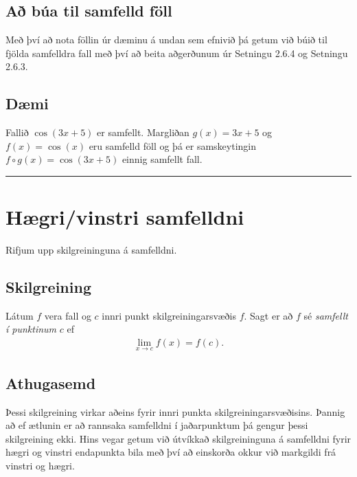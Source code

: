 \documentclass[a4paper,10pt,icelandic]{sphinxmanual}
\begin{document}
\subsection{Að búa til samfelld föll}
\label{kafli02:a-bua-til-samfelld-foll}
Með því að nota föllin úr dæminu á undan sem efnivið þá getum við búið
til fjölda samfelldra fall með því að beita aðgerðunum úr Setningu 2.6.4
og Setningu 2.6.3.


\subsection{Dæmi}
\label{kafli02:id14}\label{kafli02:index-10}
Fallið \(\cos(3x+5)\) er samfellt. Margliðan \(g(x) =3x+5\) og
\(f(x) = \cos(x)\) eru samfelld föll og þá er samskeytingin
\(f\circ g(x) = \cos(3x+5)\) einnig samfellt fall.


\bigskip\hrule{}\bigskip



\section{Hægri/vinstri samfelldni}
\label{kafli02:haegri-vinstri-samfelldni}
Rifjum upp skilgreininguna á samfelldni.


\subsection{Skilgreining}
\label{kafli02:skilgreining}
Látum \(f\) vera fall og \(c\) innri punkt skilgreiningarsvæðis
\(f\). Sagt er að \(f\) sé \emph{samfellt í punktinum} \(c\) ef
\begin{equation*}
\begin{split}\lim_{x\rightarrow c}f(x)=f(c).\end{split}
\end{equation*}

\subsection{Athugasemd}
\label{kafli02:athugasemd}
Þessi skilgreining virkar aðeins fyrir innri punkta
skilgreiningarsvæðisins. Þannig að ef ætlunin er að rannsaka samfelldni
í jaðarpunktum þá gengur þessi skilgreining ekki. Hins vegar getum við
útvíkkað skilgreininguna á samfelldni fyrir hægri og vinstri endapunkta
bila með því að einskorða okkur við markgildi frá vinstri og hægri.
\end{document}
